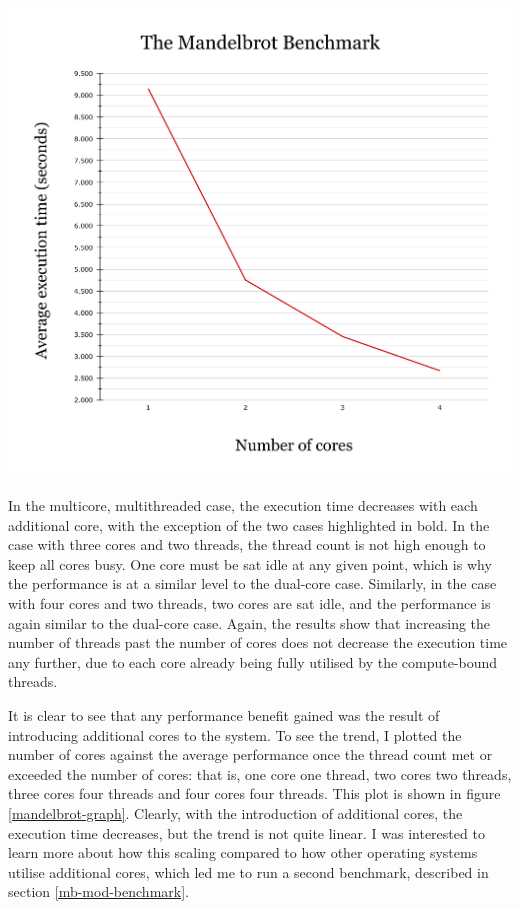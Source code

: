 \documentclass[bsc,frontabs,singlespacing,parskip,deptreport]{infthesis}
\begin{document}
\begin{table}[h]
\begin{minipage}{0.65\textwidth}
    \includegraphics[scale=0.3]{figures/mandelbrot-graph.pdf}
    \label{mandelbrot-graph}
\end{minipage}
\end{table}


In the multicore, multithreaded case, the execution time decreases with each additional core, with the exception of the two cases highlighted in bold. In the case with three cores and two threads, the thread count is not high enough to keep all cores busy. One core must be sat idle at any given point, which is why the performance is at a similar level to the dual-core case. Similarly, in the case with four cores and two threads, two cores are sat idle, and the performance is again similar to the dual-core case. Again, the results show that increasing the number of threads past the number of cores does not decrease the execution time any further, due to each core already being fully utilised by the compute-bound threads.

It is clear to see that any performance benefit gained was the result of introducing additional cores to the system. To see the trend, I plotted the number of cores against the average performance once the thread count met or exceeded the number of cores: that is, one core one thread, two cores two threads, three cores four threads and four cores four threads. This plot is shown in figure \ref{mandelbrot-graph}. Clearly, with the introduction of additional cores, the execution time decreases, but the trend is not quite linear. I was interested to learn more about how this scaling compared to how other operating systems utilise additional cores, which led me to run a second benchmark, described in section \ref{mb-mod-benchmark}.
\end{document}
